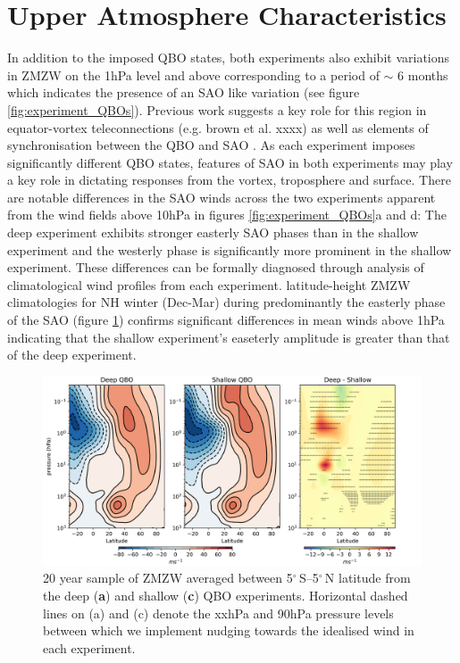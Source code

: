 \section{Upper Atmosphere Characteristics}

In addition to the imposed QBO states, both experiments also exhibit variations in ZMZW on the 1hPa level and above corresponding to a period of $\sim$ 6 months which indicates the presence of an SAO like variation (see figure \ref{fig:experiment_QBOs}). Previous work suggests a key role for this region in equator-vortex teleconnections (e.g. brown et al. xxxx) as well as elements of synchronisation between the QBO and SAO \citep{kuaiNonstationary2009}. As each experiment imposes significantly different QBO states, features of SAO in both experiments may play a key role in dictating responses from the vortex, troposphere and surface. There are notable differences in the SAO winds across the two experiments apparent from the wind fields above 10hPa in figures \ref{fig:experiment_QBOs}a and d: The deep experiment exhibits stronger easterly SAO phases than in the shallow experiment and the westerly phase is significantly more prominent in the shallow experiment. These differences can be formally diagnosed through analysis of climatological wind profiles from each experiment. latitude-height ZMZW climatologies for NH winter (Dec-Mar) during predominantly the easterly phase of the SAO (figure \ref{fig:climatologies_experiments}) confirms significant differences in mean winds above 1hPa indicating that the shallow experiment's easeterly amplitude is greater than that of the deep experiment. 

\begin{figure}[h!]
\begin{center}
\noindent\includegraphics[width = \linewidth]{Figures/Figures-deepQBO/DJF_climatologies.png}
\caption[Equatorial ZMZW time-height profiles from QBO nudging experiments]{20 year sample of ZMZW averaged between 5$^{\circ}$\,S--5$^{\circ}$\,N latitude from the deep (\textbf{a}) and shallow (\textbf{c}) QBO experiments. Horizontal dashed lines on (a) and (c) denote the xxhPa and 90hPa pressure levels between which we implement nudging towards the idealised wind in each experiment.}
\label{fig:climatologies_experiments}
\end{center}
\end{figure}

